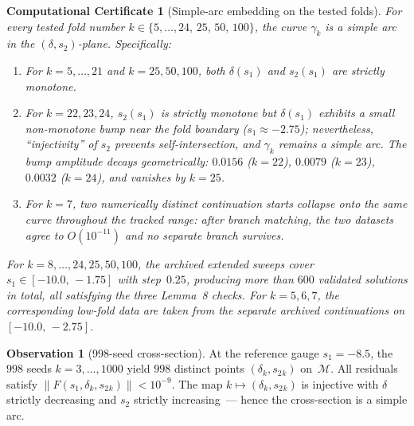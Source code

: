 \documentclass[11pt,a4paper]{article}
\theoremstyle{plain}
\newtheorem{computationalcertificate}[theorem]{Computational Certificate}
\theoremstyle{definition}
\newtheorem{observation}[theorem]{Observation}
\theoremstyle{remark}
\newcommand{\norm}[1]{\lVert #1 \rVert}
\begin{document}
\begin{computationalcertificate}[Simple-arc embedding on the tested
  folds]
\label{cert:simple-arc}
For every tested fold number $k \in \{5,\ldots,24,\, 25,\, 50,\, 100\}$,
the curve $\gamma_k$ is a simple arc in the
$(\delta,s_2)$-plane.  Specifically:
\begin{enumerate}[label=\upshape(\roman*)]
\item For $k = 5,\ldots,21$ and $k = 25,50,100$, both
  $\delta(s_1)$ and $s_2(s_1)$ are strictly monotone.
\item For $k = 22,23,24$, $s_2(s_1)$ is strictly monotone
  but $\delta(s_1)$ exhibits a small non-monotone bump
  near the fold boundary ($s_1 \approx -2.75$);
  nevertheless, ``injectivity'' of $s_2$ prevents
  self-intersection, and $\gamma_k$ remains a simple arc.
  The bump amplitude decays geometrically:
  $0.0156$ ($k=22$), $0.0079$ ($k=23$),
  $0.0032$ ($k=24$), and vanishes by $k = 25$.
\item For $k = 7$, two numerically distinct continuation starts collapse
  onto the same curve throughout the tracked range: after branch matching,
  the two datasets agree to $O(10^{-11})$ and no separate branch survives.
\end{enumerate}
For $k = 8,\ldots,24,25,50,100$, the archived extended sweeps cover
$s_1 \in [-10.0,\, -1.75]$ with step~$0.25$, producing more than
$600$ validated solutions in total, all satisfying the three Lemma~8
checks.
For $k = 5,6,7$, the corresponding low-fold data are taken from the
separate archived continuations on $[-10.0,\, -2.75]$.
\end{computationalcertificate}

\begin{observation}[998-seed cross-section]
\label{obs:cross-section}
At the reference gauge $s_1 = -8.5$, the $998$ seeds
$k = 3,\ldots,1000$ yield $998$ distinct points
$(\delta_k, s_2{}_k)$ on~$\mathcal{M}$.  All residuals
satisfy $\norm{F(s_1, \delta_k, s_2{}_k)} < 10^{-9}$.
The map $k \mapsto (\delta_k, s_2{}_k)$ is injective with
$\delta$ strictly decreasing and $s_2$ strictly increasing~---
hence the cross-section is a simple arc.
\end{observation}
\end{document}
